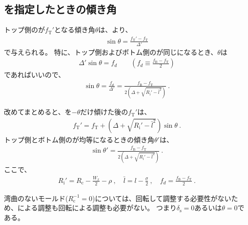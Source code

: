 \subsection{\AlocationLength を指定したときの傾き角}
トップ側の\AlocationLength が$f_\mathrm T'$となる傾き角$\theta$は、より、
\begin{align*}
  \sin\theta = \frac{f_\mathrm T'-f_\mathrm T}{\Delta'}
\end{align*}
で与えられる。
特に、トップ側およびボトム側の\AlocationLength が同じになるとき、$\theta$は
\begin{align*}
  \Delta'\sin\theta = f_d \qquad \left(f_d \equiv \frac{f_\mathrm B-f_\mathrm T}2\right)
\end{align*}
であればいいので、
\begin{align*}
  \sin\theta = \frac{f_d}{\Delta'}
  = \frac{f_\mathrm B-f_\mathrm T}{2\left(\Delta+\sqrt{R_\mathrm i'-\bar l^2}\right)}~.
\end{align*}
\begin{hosoku}
改めてまとめると、\Table を$-\theta$だけ傾けた後の\TopReAlocationLength$f_\mathrm T'$は、
\begin{align*}
  f_\mathrm T' = f_\mathrm T+\left(\Delta+\sqrt{R_\mathrm i'-\bar l^2}\right)\sin\theta\ .
\end{align*}
トップ側とボトム側の\AlocationLength が均等になるときの傾き角\textbf{\EqualAlocationAngle}$\theta'$は、
\begin{align*}
  \sin\theta' = \frac{f_\mathrm B-f_\mathrm T}{2\left(\Delta+\sqrt{R_\mathrm i'-\bar l^2}\right)}\ .
\end{align*}
ここで、
\begin{align*}
  R_\mathrm i' = R_\mathrm c-\frac{W_x}2-\rho\ ,\quad
  \bar l = l-\frac\sigma2\ ,\quad
  f_d = \frac{f_\mathrm B-f_\mathrm T}2\ .
\end{align*}
\end{hosoku}



湾曲のないモールド($R_\mathrm c^{-1}= 0$)については、回転して調整する必要性がないため、\Spacer による調整も回転による調整も必要がない。
つまり$\delta_\mathrm s = 0$あるいは$\theta = 0$である。

